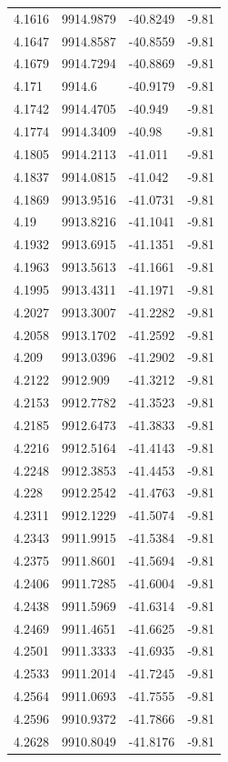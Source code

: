 \begin{table}[H]
\begin{tabular}{llll}
4.1616 & 9914.9879 & -40.8249 & -9.81 \\
4.1647 & 9914.8587 & -40.8559 & -9.81 \\
4.1679 & 9914.7294 & -40.8869 & -9.81 \\
4.171 & 9914.6 & -40.9179 & -9.81 \\
4.1742 & 9914.4705 & -40.949 & -9.81 \\
4.1774 & 9914.3409 & -40.98 & -9.81 \\
4.1805 & 9914.2113 & -41.011 & -9.81 \\
4.1837 & 9914.0815 & -41.042 & -9.81 \\
4.1869 & 9913.9516 & -41.0731 & -9.81 \\
4.19 & 9913.8216 & -41.1041 & -9.81 \\
4.1932 & 9913.6915 & -41.1351 & -9.81 \\
4.1963 & 9913.5613 & -41.1661 & -9.81 \\
4.1995 & 9913.4311 & -41.1971 & -9.81 \\
4.2027 & 9913.3007 & -41.2282 & -9.81 \\
4.2058 & 9913.1702 & -41.2592 & -9.81 \\
4.209 & 9913.0396 & -41.2902 & -9.81 \\
4.2122 & 9912.909 & -41.3212 & -9.81 \\
4.2153 & 9912.7782 & -41.3523 & -9.81 \\
4.2185 & 9912.6473 & -41.3833 & -9.81 \\
4.2216 & 9912.5164 & -41.4143 & -9.81 \\
4.2248 & 9912.3853 & -41.4453 & -9.81 \\
4.228 & 9912.2542 & -41.4763 & -9.81 \\
4.2311 & 9912.1229 & -41.5074 & -9.81 \\
4.2343 & 9911.9915 & -41.5384 & -9.81 \\
4.2375 & 9911.8601 & -41.5694 & -9.81 \\
4.2406 & 9911.7285 & -41.6004 & -9.81 \\
4.2438 & 9911.5969 & -41.6314 & -9.81 \\
4.2469 & 9911.4651 & -41.6625 & -9.81 \\
4.2501 & 9911.3333 & -41.6935 & -9.81 \\
4.2533 & 9911.2014 & -41.7245 & -9.81 \\
4.2564 & 9911.0693 & -41.7555 & -9.81 \\
4.2596 & 9910.9372 & -41.7866 & -9.81 \\
4.2628 & 9910.8049 & -41.8176 & -9.81 \\

\end{tabular}
\end{table}
